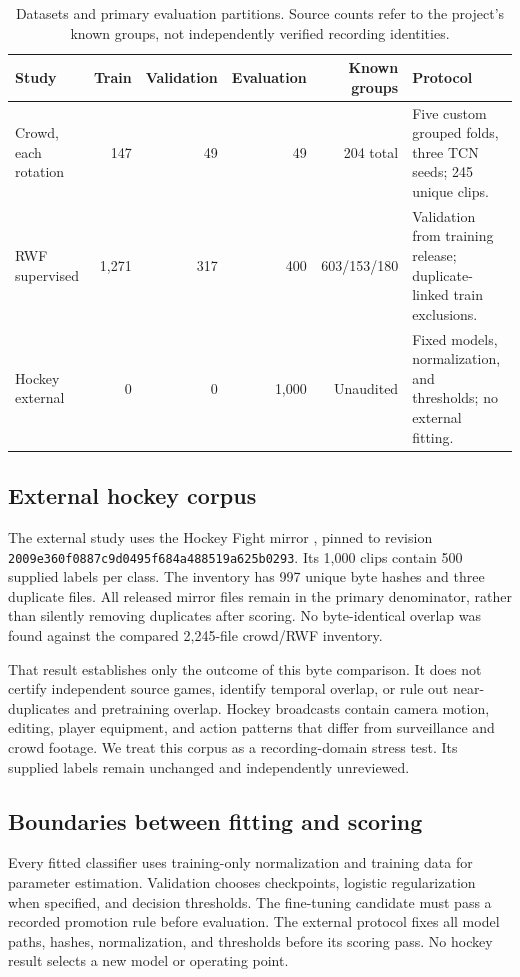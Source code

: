 \begin{table}[t]
\caption{Datasets and primary evaluation partitions. Source counts refer to the project's known groups, not independently verified recording identities.}
\label{tab:data}\centering
\begin{tabularx}{\textwidth}{lrrrrY}
\toprule
Study & Train & Validation & Evaluation & Known groups & Protocol\\
\midrule
Crowd, each rotation & 147 & 49 & 49 & 204 total & Five custom grouped folds, three TCN seeds; 245 unique clips.\\
RWF supervised & 1,271 & 317 & 400 & 603/153/180 & Validation from training release; duplicate-linked train exclusions.\\
Hockey external & 0 & 0 & 1,000 & Unaudited & Fixed models, normalization, and thresholds; no external fitting.\\
\bottomrule
\end{tabularx}
\end{table}

\subsection{External hockey corpus}
The external study uses the Hockey Fight mirror \cite{hockeymirror}, pinned to revision \texttt{2009e360f0887c9d0495f684a488519a625b0293}. Its 1,000 clips contain 500 supplied labels per class. The inventory has 997 unique byte hashes and three duplicate files. All released mirror files remain in the primary denominator, rather than silently removing duplicates after scoring. No byte-identical overlap was found against the compared 2,245-file crowd/RWF inventory.

That result establishes only the outcome of this byte comparison. It does not certify independent source games, identify temporal overlap, or rule out near-duplicates and pretraining overlap. Hockey broadcasts contain camera motion, editing, player equipment, and action patterns that differ from surveillance and crowd footage. We treat this corpus as a recording-domain stress test. Its supplied labels remain unchanged and independently unreviewed.

\subsection{Boundaries between fitting and scoring}
Every fitted classifier uses training-only normalization and training data for parameter estimation. Validation chooses checkpoints, logistic regularization when specified, and decision thresholds. The fine-tuning candidate must pass a recorded promotion rule before evaluation. The external protocol fixes all model paths, hashes, normalization, and thresholds before its scoring pass. No hockey result selects a new model or operating point.


